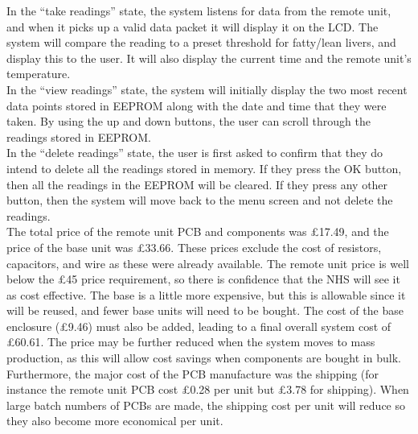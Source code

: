 In the ``take readings'' state, the system listens for data from the remote unit, and when it picks up a valid data packet it will display it on the LCD. The system will compare the reading to a preset threshold for fatty/lean livers, and display this to the user. It will also display the current time and the remote unit's temperature.\\

In the ``view readings'' state, the system will initially display the two most recent data points stored in EEPROM along with the date and time that they were taken. By using the up and down buttons, the user can scroll through the readings stored in EEPROM.\\

In the ``delete readings'' state, the user is first asked to confirm that they do intend to delete all the readings stored in memory. If they press the OK button, then all the readings in the EEPROM will be cleared. If they press any other button, then the system will move back to the menu screen and not delete the readings.\\

The total price of the remote unit PCB and components was £17.49, and the price of the base unit was £33.66. These prices exclude the cost of resistors, capacitors, and wire as these were already available. The remote unit price is well below the £45 price requirement, so there is confidence that the NHS will see it as cost effective. The base is a little more expensive, but this is allowable since it will be reused, and fewer base units will need to be bought. The cost of the base enclosure (£9.46) must also be added, leading to a final overall system cost of £60.61. The price may be further reduced when the system moves to mass production, as this will allow cost savings when components are bought in bulk. Furthermore, the major cost of the PCB manufacture was the shipping (for instance the remote unit PCB cost £0.28 per unit but £3.78 for shipping). When large batch numbers of PCBs are made, the shipping cost per unit will reduce so they also become more economical per unit.
